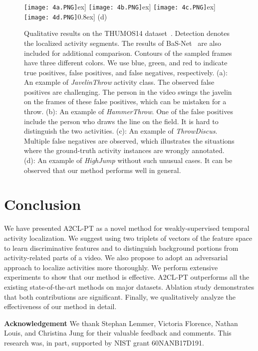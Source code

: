 \documentclass[runningheads]{llncs}
\newcommand{\thumos}{\mbox{THUMOS14}}
\newcommand{\ourlossname}{\mbox{A2CL-PT}}
\begin{document}
\begin{figure}[htbp]
  \small
    \texttt{[image: 4a.PNG]}\1ex]
    \texttt{[image: 4b.PNG]}\1ex]
    \texttt{[image: 4c.PNG]}\1ex]
    \texttt{[image: 4d.PNG]}\-0.8ex] \hspace*{20.4em}(d)
  \caption{Qualitative results on the \thumos{} dataset~\cite{THUMOS14}. Detection denotes the localized activity segments. The results of \mbox{BaS-Net}~\cite{lee2020background} are also included for additional comparison. Contours of the sampled frames have three different colors. We use blue, green, and red to indicate true positives, false positives, and false negatives, respectively. (a): An example of \textit{JavelinThrow} activity class. The observed false positives are challenging. The person in the video swings the javelin on the frames of these false positives, which can be mistaken for a throw. (b): An example of \textit{HammerThrow}. One of the false positives include the person who draws the line on the field. It is hard to distinguish the two activities. (c): An example of \textit{ThrowDiscus}. Multiple false negatives are observed, which illustrates the situations where the ground-truth activity instances are wrongly annotated. (d): An example of \textit{HighJump} without such unusual cases. It can be observed that our method performs well in general.}
  \label{fig4}
\end{figure}

\section{Conclusion}
We have presented \ourlossname{} as a novel method for weakly-supervised temporal activity localization. We suggest using two triplets of vectors of the feature space to learn discriminative features and to distinguish background portions from activity-related parts of a video. We also propose to adopt an adversarial approach to localize activities more thoroughly. We perform extensive experiments to show that our method is effective. \ourlossname{} outperforms all the existing state-of-the-art methods on major datasets. Ablation study demonstrates that both contributions are significant. Finally, we qualitatively analyze the effectiveness of our method in detail.

\bigskip

\noindent \textbf{Acknowledgement } We thank Stephan Lemmer, Victoria Florence, Nathan Louis, and Christina Jung for their valuable feedback and comments. This research was, in part, supported by NIST grant 60NANB17D191.



\end{document}
